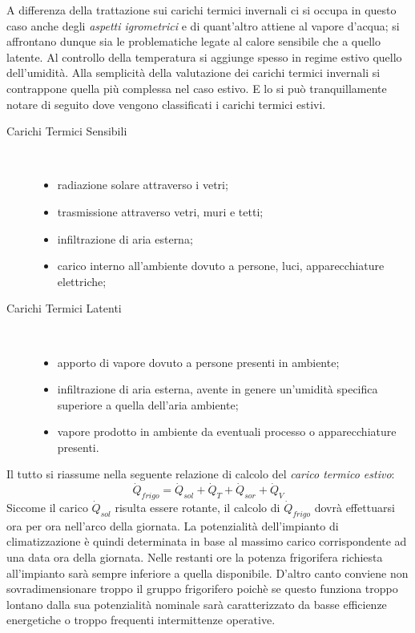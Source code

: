 A differenza della trattazione sui carichi termici invernali ci si occupa in questo caso anche degli \emph{aspetti igrometrici} e di quant'altro attiene al vapore d'acqua; si affrontano dunque sia le problematiche legate al calore sensibile che a quello latente. Al controllo della temperatura si aggiunge spesso in regime estivo quello dell'umidità. Alla semplicità della valutazione dei carichi termici invernali si contrappone quella più complessa nel caso estivo. E lo si può tranquillamente notare di seguito dove vengono classificati i carichi termici estivi.
\begin{description}
	\item[Carichi Termici Sensibili] $ $
	\begin{itemize}
		\item radiazione solare attraverso i vetri;
		\item trasmissione attraverso vetri, muri e tetti;
		\item infiltrazione di aria esterna;
		\item carico interno all'ambiente dovuto a persone, luci, apparecchiature elettriche;
	\end{itemize}
	\item[Carichi Termici Latenti] $ $
	\begin{itemize}
		\item apporto di vapore dovuto a persone presenti in ambiente;
		\item infiltrazione di aria esterna, avente in genere un'umidità specifica superiore a quella dell'aria ambiente;
		\item vapore prodotto in ambiente da eventuali processo o apparecchiature presenti.
	\end{itemize}
\end{description}
Il tutto si riassume nella seguente relazione di calcolo del \emph{carico termico estivo}:
\begin{equation}
	\label{caricotermico:estivo}
	\dot{Q}_{frigo}=\dot{Q}_{sol}+\dot{Q}_T+\dot{Q}_{sor}+\dot{Q}_V
\end{equation}
Siccome il carico $\dot{Q}_{sol}$ risulta essere rotante, il calcolo di $\dot{Q}_{frigo}$ dovrà effettuarsi ora per ora nell'arco della giornata. La potenzialità dell'impianto di climatizzazione è quindi determinata in base al massimo carico corrispondente ad una data ora della giornata. Nelle restanti ore la potenza frigorifera richiesta all'impianto sarà sempre inferiore a quella disponibile. D'altro canto conviene non sovradimensionare troppo il gruppo frigorifero poichè se questo funziona troppo lontano dalla sua potenzialità nominale sarà caratterizzato da basse efficienze energetiche o troppo frequenti intermittenze operative. 

